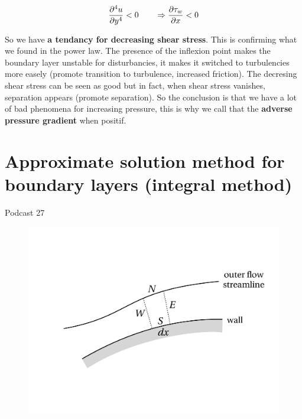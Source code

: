	\begin{equation}
		\frac{\D ^4 u}{\D y^4} <0 \qquad \Rightarrow \frac{\D \tau _w}{\D x} < 0
	\end{equation}
			
	So we have \textbf{a tendancy for decreasing shear stress}. This is confirming what we found in the power law. The presence of the inflexion point makes the boundary layer unstable for disturbancies, it makes it switched to turbulencies more easely (promote transition to turbulence, increased friction). The decresing shear stress can be seen as good but in fact, when shear stress vanishes, separation appears (promote separation). So the conclusion is that we have a lot of bad phenomena for increasing pressure, this is why we call that the \textbf{adverse pressure gradient} when positif. 
	

\section{Approximate solution method for boundary layers (integral method)}
	Podcast 27
	\\
	

\begin{figure}
\begin{center}
\includegraphics[scale=0.45]{ch5/16}
\end{center}
\end{figure}


